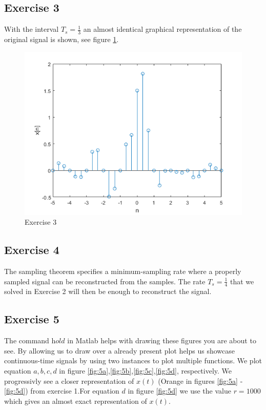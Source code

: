 \documentclass[a4paper]{article}
\begin{document}
\subsection{Exercise 3}
With the interval $T_s = \frac{1}{3}$ an almost identical graphical representation of the original signal is shown, see figure \ref{fig:3}.
\begin{figure}
    \centering
    \includegraphics{3.png}
    \caption{Exercise 3}
    \label{fig:3}
\end{figure}

\subsection{Exercise 4}
The sampling theorem specifies a minimum-sampling rate where a properly sampled signal can be reconstructed from the samples. The rate $T_s = \frac{1}{4}$ that we solved in Exercise 2 will then be enough to reconstruct the signal.

\subsection{Exercise 5}
The command $\textit{hold}$ in Matlab helps with drawing these figures you are about to see. By allowing us to draw over a already present plot helps us showcase continuous-time signals by using two instances to plot multiple functions.
We plot equation $a,b,c,d$ in figure \ref{fig:5a},\ref{fig:5b},\ref{fig:5c},\ref{fig:5d}, respectively. We progressivly see a closer representation of $x(t)$ (Orange in figures \ref{fig:5a} - \ref{fig:5d}) from exercise 1.For equation $d$ in figure \ref{fig:5d} we use the value $r = 1000$ which gives an almost exact representation of $x(t)$. \\
\end{document}
